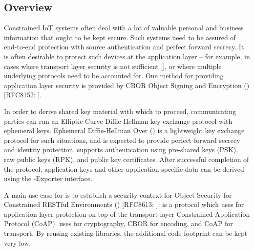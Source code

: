 



\subsection{Overview}
Constrained IoT systems often deal with a lot of valuable personal and business information that ought to be kept secure. Such systems need to be assured of end-to-end protection with source authentication and perfect forward secrecy. It is often desirable to protect such devices at the application layer -- for example, in cases where transport layer security is not sufficient [\mcneed], or where multiple underlying protocols need to be accounted for. One method for providing application layer security is provided by CBOR Object Signing and Encryption (\mCose) [RFC8152: \mcfix].  

In order to derive shared key material with which to proceed, communicating parties can run an Elliptic Curve Diffie-Hellman key exchange protocol with ephemeral keys. Ephemeral Diffie-Hellman Over \mCose (\mEdhoc) is a lightweight key exchange protocol for such situations, and is expected to provide perfect forward secrecy and identity protection. \mEdhoc supports authentication using pre-shared keys (PSK), raw public keys (RPK), and public key certificates. After successful completion of the \mEdhoc protocol, application keys and other application specific data can be derived using the \mEdhoc-Exporter interface. 

A main use case for \mEdhoc is to establish a security context for Object Security for Constrained RESTful Environments (\mOscore) [RFC8613: \mcfix]. \mOscore is a protocol which uses \mCose for application-layer protection on top of the transport-layer Constrained Application Protocol (CoAP). \mEdhoc uses \mCose for cryptography, CBOR for encoding, and CoAP for transport. By reusing existing libraries, the additional code footprint can be kept very low.

